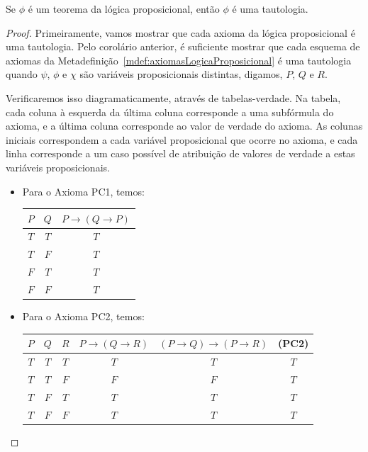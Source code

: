 \begin{metatheorem}\label{thm:PCteoremasSaoTautologias}Se $\phi$ é um teorema da lógica proposicional, então $\phi$ é uma tautologia.
\end{metatheorem}
\begin{proof}
    Primeiramente, vamos mostrar que cada axioma da lógica proposicional é uma tautologia.
    Pelo corolário anterior, é suficiente mostrar que cada esquema de axiomas da Metadefinição~\ref{mdef:axiomasLogicaProposicional} é uma tautologia quando $\psi$, $\phi$ e $\chi$ são variáveis proposicionais distintas, digamos, $P$, $Q$ e $R$.

    Verificaremos isso diagramaticamente, através de tabelas-verdade.
    Na tabela, cada coluna à esquerda da última coluna corresponde a uma subfórmula do axioma, e a última coluna corresponde ao valor de verdade do axioma.
    As colunas iniciais correspondem a cada variável proposicional que ocorre no axioma, e cada linha corresponde a um caso possível de atribuição de valores de verdade a estas variáveis proposicionais.
    \begin{itemize}
        \item Para o Axioma PC1, temos:
        \begin{center}
            \begin{tabular}{c|c|c}
                $P$ & $Q$ & $P \rightarrow (Q \rightarrow P)$ \\
                \hline
                $T$ & $T$ & $T$ \\
                $T$ & $F$ & $T$ \\
                $F$ & $T$ & $T$ \\
                $F$ & $F$ & $T$
            \end{tabular}
        \end{center}
        \item Para o Axioma PC2, temos:
        \begin{center}
            \begin{tabular}{c|c|c|c|c|c}
                $P$ & $Q$ & $R$ & $P \rightarrow (Q \rightarrow R)$ & $(P\rightarrow Q) \rightarrow (P \rightarrow R)$ & (PC2) \\
                \hline
                $T$ & $T$ & $T$ & $T$ & $T$ & $T$ \\
                $T$ & $T$ & $F$ & $F$ & $F$ & $T$ \\
                $T$ & $F$ & $T$ & $T$ & $T$ & $T$ \\
                $T$ & $F$ & $F$ & $T$ & $T$ & $T$ \\

\end{tabular}
\end{center}
\end{itemize}
\end{proof}
